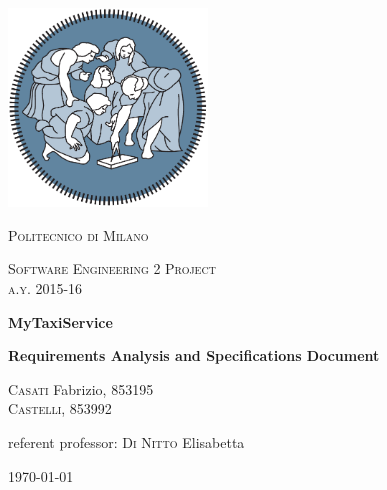 



%
%    

\begin{titlepage}
	\centering
	\includegraphics[width=150pt]{polimi_logo}\par\vspace{1cm}
	{\scshape\LARGE
		Politecnico di Milano\par}
	\vspace{1cm}
	{\scshape\Large
		Software Engineering 2 Project\\
		a.y. 2015-16\par}
	\vspace{1.5cm}
	{\huge\bfseries
		MyTaxiService\\\par}
	{\Large\bfseries
		Requirements Analysis and Specifications Document\par}
	\vspace{2cm}
	{\Large
		{\scshape Casati} Fabrizio, 853195\\
		{\scshape Castelli}, 853992\par}
	\vfill
	referent professor: {\scshape Di Nitto} Elisabetta\par

	\vfill

	{\large \today\par}
\end{titlepage}


